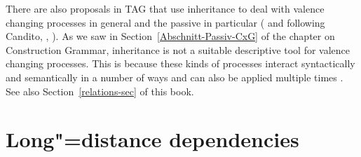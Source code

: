 There are also proposals in TAG that use inheritance to deal with valence changing processes 
in general and the passive in particular (\citealp{Candito96a} and \citealp*{KSYJ2006a} following
Candito, \citealp[]{KLOP2016a}, \citealp[210]{LK2017a}). As we saw in Section~\ref{Abschnitt-Passiv-CxG} of 
the chapter on Construction Grammar, inheritance is not a suitable descriptive tool for valence changing processes. This is because these kinds of processes
interact syntactically and semantically in a number of ways and can also be applied multiple times
\parencites{Mueller2006d,Mueller2007d}[Section~7.5.2]{MuellerLehrbuch1}{MuellerUnifying}{MWArgSt}. See also Section~\ref{relations-sec} of this book.%

\section{Long"=distance dependencies}
\label{TAG-Fernabh}

